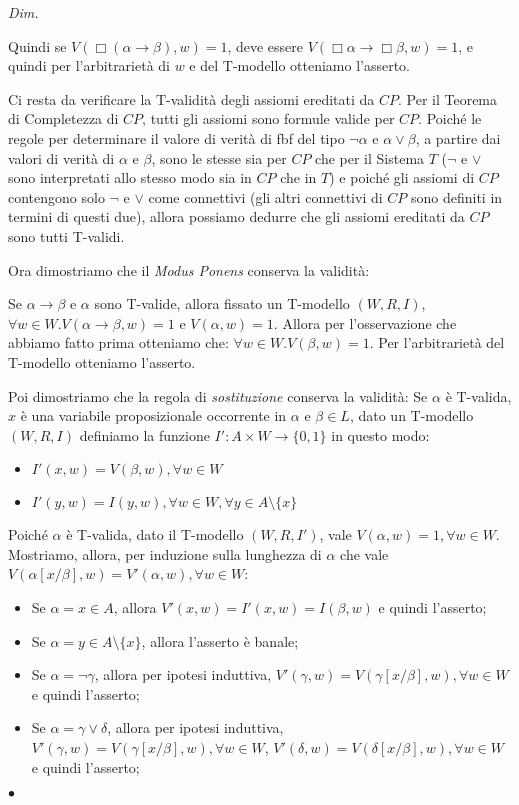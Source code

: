 \documentclass[a4paper, titlepage, 12pt]{report}
\newenvironment{proof}
    {\textit{Dim.}
    }
    {\begin{flushright}$\bullet$\end{flushright}
    }
\begin{document}
\begin{proof}
Quindi se $V(\Box(\alpha \rightarrow \beta), w) = 1$, deve essere $V(\Box \alpha \rightarrow \Box \beta, w) = 1$,
e quindi per l'arbitrarietà di $w$ e del T-modello otteniamo l'asserto.

Ci resta da verificare la T-validità degli assiomi ereditati da $CP$.
Per il Teorema di Completezza di $CP$, tutti gli assiomi sono formule valide per $CP$.
Poiché le regole per determinare il valore di verità di fbf
del tipo $\neg \alpha$ e $\alpha \lor \beta$, a partire dai valori di verità
di $\alpha$ e $\beta$, sono le stesse sia per $CP$ che per il Sistema $T$
($\neg$ e $\lor$ sono interpretati allo stesso modo sia in $CP$ che in $T$)
e poiché gli assiomi di $CP$ contengono solo $\neg$ e $\lor$ come connettivi
(gli altri connettivi di $CP$ sono definiti in termini di questi due),
allora possiamo dedurre che gli assiomi ereditati da $CP$ sono tutti T-validi.


Ora dimostriamo che il \emph{Modus Ponens} conserva la validità:

Se $\alpha \rightarrow \beta$ e $\alpha$ sono T-valide, allora fissato un T-modello $(W, R, I)$,
$\forall w \in W. V(\alpha \rightarrow \beta, w) = 1$ e $V(\alpha, w) = 1$.
Allora per l'osservazione che abbiamo fatto prima otteniamo che:
$\forall w \in W. V(\beta, w) = 1$. Per l'arbitrarietà del T-modello otteniamo l'asserto.

Poi dimostriamo che la regola di \emph{sostituzione} conserva la validità:
Se $\alpha$ è T-valida, $x$ è una variabile proposizionale occorrente in $\alpha$
e $\beta \in L$, dato un T-modello $(W, R, I)$ definiamo
la funzione $I' : A \times W \to \{0, 1\}$ in questo modo:
\begin{itemize}
    \item $I'(x, w) = V(\beta, w), \forall w \in W$
    \item $I'(y, w) = I(y, w), \forall w \in W, \forall y \in A \setminus \{x\}$
\end{itemize}
Poiché $\alpha$ è T-valida, dato il T-modello $(W, R, I')$, vale
$V(\alpha, w) = 1, \forall w \in W$.
Mostriamo, allora, per induzione sulla lunghezza di $\alpha$ che
vale $V(\alpha[x/\beta], w) = V'(\alpha, w), \forall w \in W$:
\begin{itemize}
\item Se $\alpha = x \in A$, allora $V'(x, w) = I'(x, w) = I(\beta, w)$
      e quindi l'asserto;
\item Se $\alpha = y \in A \setminus \{x\}$, allora l'asserto è banale;
\item Se $\alpha = \neg \gamma$, allora per ipotesi induttiva,
      $V'(\gamma, w) = V(\gamma[x/\beta], w), \forall w \in W$ e quindi l'asserto;
\item Se $\alpha = \gamma \lor \delta$, allora per ipotesi induttiva,
      $V'(\gamma, w) = V(\gamma[x/\beta], w), \forall w \in W$,
      $V'(\delta, w) = V(\delta[x/\beta], w), \forall w \in W$
      e quindi l'asserto;


\end{itemize}
\end{proof}
\end{document}
